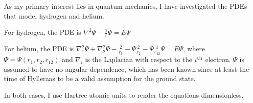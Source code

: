 \documentclass{article}
\begin{document}
As my primary interest lies in quantum mechanics, I have investigated the PDEs
that model hydrogen and helium.

For hydrogen, the PDE is $\nabla^2 \Psi - \frac{1}{r} \Psi = E \Psi$

For helium, the PDE is $\nabla_1^2 \Psi + \nabla_2^2 \Psi - \frac{2}{r_1} - \Psi \frac{2}{r_2} - \Psi \frac{1}{r_{12}} \Psi = E \Psi$,
where $\Psi=\Psi(r_1,r_2,r_{12})$ and $\nabla_i$ is the Laplacian with respect to the $i^{\rm th}$ electron.
$\Psi$ is assumed to have no angular dependence, which has been known since
at least the time of Hylleraas to be a valid assumption for the ground state.

In both cases, I use Hartree atomic units to render the equations dimensionless.

\end{document}

